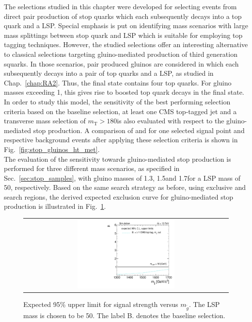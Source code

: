 The selections studied in this chapter were developed for selecting events from direct pair production of stop quarks which each subsequently decays into a top quark and a LSP. Special emphasis is put on identifying mass scenarios with large mass splittings between stop quark and LSP which is suitable for employing top tagging techniques. However, the studied selections offer an interesting alternative to classical selections targeting gluino-mediated production of third generation squarks. In those scenarios, pair produced gluinos are considered in which each subsequently decays into a pair of top quarks and a LSP, as studied in Chap.~\ref{chap:RA2}. Thus, the final state contains four top quarks. For gluino masses exceeding 1\tev, this gives rise to boosted top quark decays in the final state. In order to study this model, the sensitivity of the best performing selection criteria based on the baseline selection, at least one CMS top-tagged jet and a transverse mass selection of $m_\mathrm{T} > 180$\gev is also evaluated with respect to the gluino-mediated stop production. A comparison of \HT and \met for one selected signal point and respective background events after applying these selection criteria is shown in Fig.~\ref{fig:stop_gluinos_ht_met}. \\
The evaluation of the sensitivity towards gluino-mediated stop production is performed for three different mass scenarios, as specified in Sec.~\ref{sec:stop_samples}, with gluino masses of 1.3\tev, 1.5\tev and 1.7\tev for a LSP mass of 50\gev, respectively. Based on the same search strategy as before, using exclusive \HT and \met search regions, the derived expected exclusion curve for gluino-mediated stop production is illustrated in Fig.~\ref{fig:stop_gluino_mediated_limit}. 
\begin{figure}[!t]
  \centering
  \begin{tabular}{c}
                \includegraphics[width=0.49\textwidth]{figures/limitplot4BinSel_T1tttt.pdf} 
  \end{tabular}
  \caption{Expected 95\% upper limit for signal strength versus $m_{\tilde{g}}$. The LSP mass is chosen to be 50\gev. The label B. denotes the baseline selection.}
  \label{fig:stop_gluino_mediated_limit}
\end{figure}
